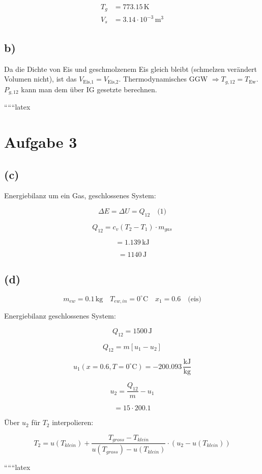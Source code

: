 \begin{align*}
T_g &= 773.15 \, \text{K} \\
V_s &= 3.14 \cdot 10^{-3} \, \text{m}^3
\end{align*}

\subsection*{b)}

Da die Dichte von Eis und geschmolzenem Eis gleich bleibt (schmelzen verändert Volumen nicht), ist das $V_{\text{Eis,1}} = V_{\text{Eis,2}}$. Thermodynamisches GGW $\Rightarrow T_{g,12} = T_{\text{Ew}}$. $P_{g,12}$ kann man dem über IG gesetzte berechnen.

``````latex


\section*{Aufgabe 3}

\subsection*{(c)}

Energiebilanz um ein Gas, geschlossenes System:

\[
\Delta E = \Delta U = Q_{12} \quad \text{(1)}
\]

\[
Q_{12} = c_v (T_2 - T_1) \cdot m_{gas}
\]

\[
= 1.139 \, \text{kJ}
\]

\[
= 1140 \, \text{J}
\]

\subsection*{(d)}

\[
m_{ew} = 0.1 \, \text{kg} \quad T_{ew, in} = 0^\circ \text{C} \quad x_1 = 0.6 \quad \text{(eis)}
\]

Energiebilanz geschlossenes System:

\[
Q_{12} = 1500 \, \text{J}
\]

\[
Q_{12} = m \left[ u_1 - u_2 \right]
\]

\[
u_1 (x = 0.6, T = 0^\circ \text{C}) = -200.093 \, \frac{\text{kJ}}{\text{kg}}
\]

\[
u_2 = \frac{Q_{12}}{m} - u_1
\]

\[
= 15 \cdot 200.1
\]

Über $u_2$ für $T_2$ interpolieren:

\[
T_2 = u(T_{klein}) + \frac{T_{gross} - T_{klein}}{u(T_{gross}) - u(T_{klein})} \cdot (u_2 - u(T_{klein}))
\]

``````latex


